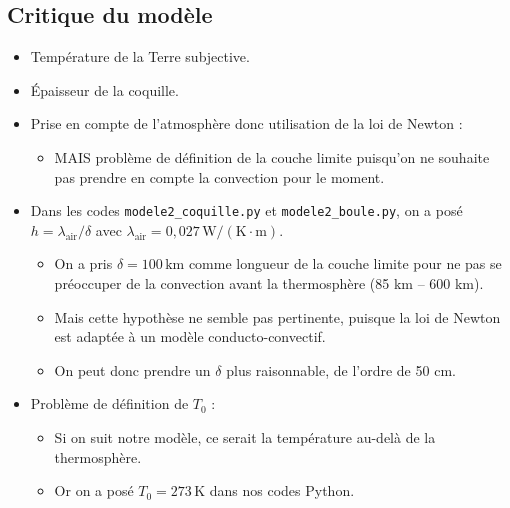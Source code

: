 \documentclass[a4paper,12pt]{article}
\begin{document}
\subsection{Critique du modèle}

\begin{itemize}
    \item Température de la Terre subjective.
    \item Épaisseur de la coquille.
    \item Prise en compte de l’atmosphère donc utilisation de la loi de Newton :
    \begin{itemize}
        \item MAIS problème de définition de la couche limite puisqu’on ne souhaite pas prendre en compte la convection pour le moment.
    \end{itemize}
    \item Dans les codes \texttt{modele2\_coquille.py} et \texttt{modele2\_boule.py}, on a posé $h = \lambda_{\text{air}} / \delta$ avec $\lambda_{\text{air}} = 0{,}027 \, \mathrm{W/(K \cdot m)}$.
    \begin{itemize}
        \item On a pris $\delta = 100\, \mathrm{km}$ comme longueur de la couche limite pour ne pas se préoccuper de la convection avant la thermosphère (85 km – 600 km).
        \item Mais cette hypothèse ne semble pas pertinente, puisque la loi de Newton est adaptée à un modèle conducto-convectif.
        \item On peut donc prendre un $\delta$ plus raisonnable, de l’ordre de 50 cm.
    \end{itemize}
    \item Problème de définition de $T_0$ :
    \begin{itemize}
        \item Si on suit notre modèle, ce serait la température au-delà de la thermosphère.
        \item Or on a posé $T_0 = 273\, \mathrm{K}$ dans nos codes Python.
    \end{itemize}
\end{itemize}

\newpage
\end{document}
